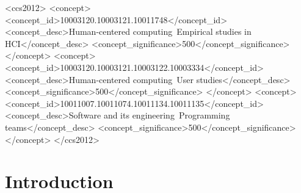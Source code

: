 \documentclass[sigconf]{acmart}
\begin{document}
\begin{CCSXML}
<ccs2012>
   <concept>
       <concept_id>10003120.10003121.10011748</concept_id>
       <concept_desc>Human-centered computing~Empirical studies in HCI</concept_desc>
       <concept_significance>500</concept_significance>
       </concept>
   <concept>
       <concept_id>10003120.10003121.10003122.10003334</concept_id>
       <concept_desc>Human-centered computing~User studies</concept_desc>
       <concept_significance>500</concept_significance>
       </concept>
   <concept>
       <concept_id>10011007.10011074.10011134.10011135</concept_id>
       <concept_desc>Software and its engineering~Programming teams</concept_desc>
       <concept_significance>500</concept_significance>
       </concept>
 </ccs2012>
\end{CCSXML}


\maketitle

\section{Introduction}
\label{sec:introduction}
\end{document}
